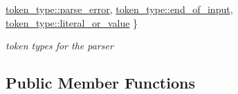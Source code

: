 \begin{DoxyCompactItemize}
\hyperlink{classnlohmann_1_1detail_1_1lexer_a3f313cdbe187cababfc5e06f0b69b098a456e19aeafa334241c7ff3f589547f9d}{token\+\_\+type\+::parse\+\_\+error}, 
\hyperlink{classnlohmann_1_1detail_1_1lexer_a3f313cdbe187cababfc5e06f0b69b098aca11f56dd477c09e06583dbdcda0985f}{token\+\_\+type\+::end\+\_\+of\+\_\+input}, 
\newline
\hyperlink{classnlohmann_1_1detail_1_1lexer_a3f313cdbe187cababfc5e06f0b69b098ad2a8e6f6721cccec0b466301dd9495a5}{token\+\_\+type\+::literal\+\_\+or\+\_\+value}
 \}\begin{DoxyCompactList}\small\item\em token types for the parser \end{DoxyCompactList}
\end{DoxyCompactItemize}
\subsection*{Public Member Functions}
